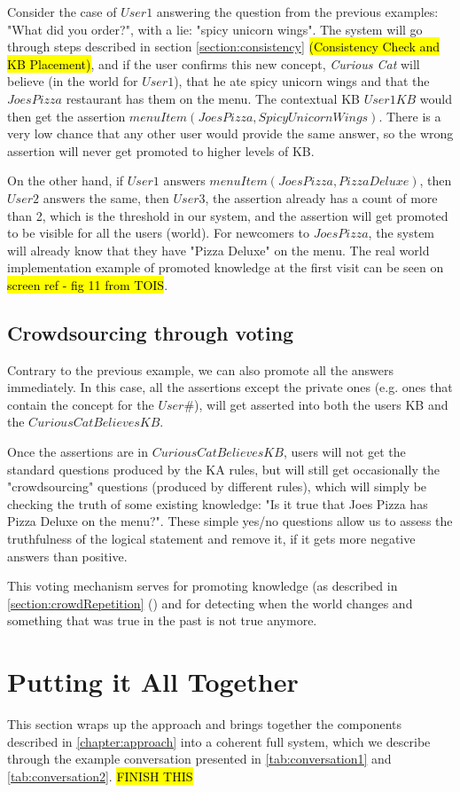 Consider the case of $User1$ answering the question from the previous examples: 
"What did you order?", with a lie: "spicy unicorn wings". The system will go 
through steps described in section \autoref{section:consistency}
\hl{(Consistency Check and KB Placement)}, and if the user confirms this new 
concept, \emph{Curious Cat} will believe (in the world for $User1$), that he 
ate spicy unicorn wings and that the $JoesPizza$ restaurant has them on the
menu. The contextual KB $User1KB$ would then get the assertion 
$menuItem(JoesPizza,SpicyUnicornWings)$. There is a very low chance that any 
other user would provide the same answer, so the wrong assertion will never get 
promoted to higher levels of KB.

On the other hand, if $User1$ answers $menuItem(JoesPizza,PizzaDeluxe)$, then 
$User2$ answers the same, then $User3$, the assertion already has a count of 
more than 2, which is the threshold in our system, and the assertion will get 
promoted to be visible for all the users (world). For newcomers to $JoesPizza$, 
the system will already know that they have "Pizza Deluxe" on the menu.
The real world implementation example of promoted knowledge at the first 
visit can be seen on \hl{screen ref - fig 11 from TOIS}.


\subsection{Crowdsourcing through voting}
\label{section:crowdVoting}
Contrary to the previous example, we can also promote all the answers 
immediately. In this case, all the assertions except the private ones 
(e.g. ones that contain the concept for the $User\#$), will get asserted into 
both the users KB and the $CuriousCatBelievesKB$.

Once the assertions are in $CuriousCatBelievesKB$, users will not get the 
standard questions produced by the KA rules, but will still get occasionally 
the "crowdsourcing" questions (produced by different rules), which will 
simply be checking the truth of some existing knowledge: "Is it true that Joes 
Pizza has Pizza Deluxe on the menu?". These simple yes/no questions allow us to 
assess the truthfulness of the logical statement and remove it, if it gets 
more negative answers than positive.

This voting mechanism serves for promoting knowledge (as described in 
\autoref{section:crowdRepetition} () and for 
detecting when the world changes and something that was true in the past is not 
true anymore.

\section{Putting it All Together}
\label{section:together}
This section wraps up the approach and brings together the components described
in \autoref{chapter:approach} into a coherent full system, which we describe 
through the example conversation presented in \autoref{tab:conversation1} and
\autoref{tab:conversation2}.
\hl{FINISH THIS}
